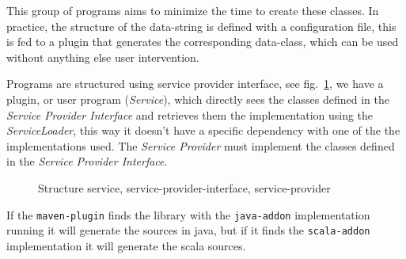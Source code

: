 \documentclass[a4paper,10pt]{report}
\begin{document}
This group of programs aims to minimize the time to create these classes. 
In practice, the structure of the data-string is defined with a configuration 
file, this is fed to a plugin that generates the corresponding data-class, 
which can be used without anything else user intervention.

Programs are structured using service provider interface, see 
fig.~\ref{fig:spi}, we have a plugin, or user program (\textsl{Service}), which 
directly sees the classes defined in the \textsl{Service Provider Interface} and 
retrieves them the implementation using the \textsl{ServiceLoader}, this way it 
doesn't have a specific dependency with one of the the implementations used. 
The \textsl{Service Provider} must implement the classes defined in the 
\textsl{Service Provider Interface}.

\begin{figure}[!htb]
\centering
{}
\caption{Structure service, service-provider-interface, service-provider} 
\label{fig:spi}
\end{figure}

If the \verb!maven-plugin! finds the library with the \verb!java-addon! 
implementation running it will generate the sources in java, but if it finds 
the \verb!scala-addon! implementation it will generate the scala sources.
\end{document}
